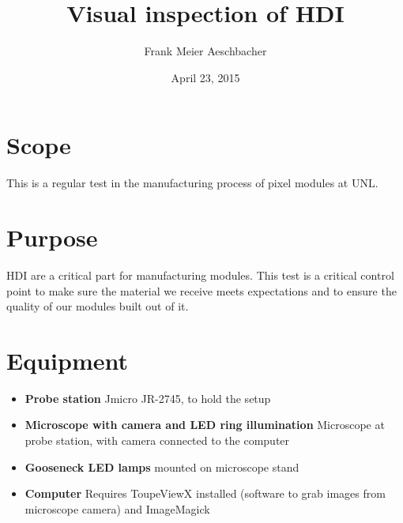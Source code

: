 \documentclass[12pt]{unlsilabsop}
\title{Visual inspection of HDI}
\date{April 23, 2015}
\author{Frank Meier Aeschbacher}
\begin{document}
\maketitle

\section{Scope}
This is a regular test in the manufacturing process of pixel modules at UNL.

\section{Purpose}
HDI are a critical part for manufacturing modules. This test is a critical control point to make sure the material we receive meets expectations and to ensure the quality of our modules built out of it.



\section{Equipment}

\begin{itemize}
\item \textbf{Probe station} Jmicro JR-2745, to hold the setup
\item \textbf{Microscope with camera and LED ring illumination} Microscope at probe station, with camera connected to the computer
\item \textbf{Gooseneck LED lamps} mounted on microscope stand
\item \textbf{Computer} Requires ToupeViewX installed (software to grab images from microscope camera) and ImageMagick
\end{itemize}
\end{document}
